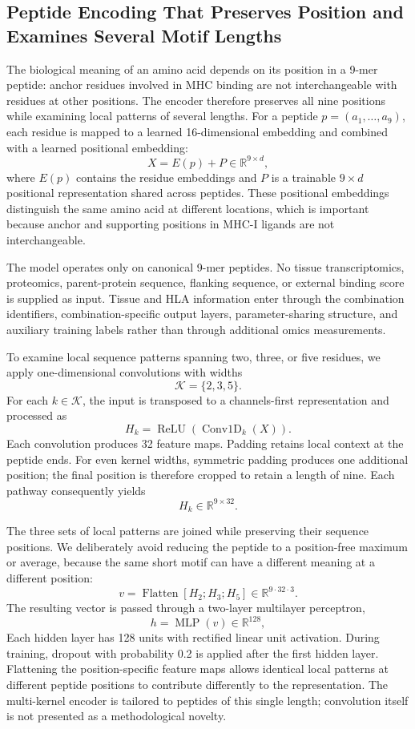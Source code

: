 \subsection{Peptide Encoding That Preserves Position and Examines Several Motif Lengths}

The biological meaning of an amino acid depends on its position in a 9-mer peptide: anchor residues involved in MHC binding are not interchangeable with residues at other positions. The encoder therefore preserves all nine positions while examining local patterns of several lengths. For a peptide \(p=(a_1,\ldots,a_9)\), each residue is mapped to a learned 16-dimensional embedding and combined with a learned positional embedding:
\[
X=E(p)+P \in \mathbb{R}^{9\times d},
\]
where \(E(p)\) contains the residue embeddings and \(P\) is a trainable \(9\times d\) positional representation shared across peptides. These positional embeddings distinguish the same amino acid at different locations, which is important because anchor and supporting positions in MHC-I ligands are not interchangeable.

The model operates only on canonical 9-mer peptides. No tissue transcriptomics, proteomics, parent-protein sequence, flanking sequence, or external binding score is supplied as input. Tissue and HLA information enter through the combination identifiers, combination-specific output layers, parameter-sharing structure, and auxiliary training labels rather than through additional omics measurements.

To examine local sequence patterns spanning two, three, or five residues, we apply one-dimensional convolutions with widths
\[
\mathcal{K}=\{2,3,5\}.
\]
For each \(k\in\mathcal{K}\), the input is transposed to a channels-first representation and processed as
\[
H_k
=
\operatorname{ReLU}
\left(
\operatorname{Conv1D}_{k}(X)
\right).
\]
Each convolution produces 32 feature maps. Padding retains local context at the peptide ends. For even kernel widths, symmetric padding produces one additional position; the final position is therefore cropped to retain a length of nine. Each pathway consequently yields
\[
H_k\in\mathbb{R}^{9\times 32}.
\]

The three sets of local patterns are joined while preserving their sequence positions. We deliberately avoid reducing the peptide to a position-free maximum or average, because the same short motif can have a different meaning at a different position:
\[
v
=
\operatorname{Flatten}
\left[
H_2;H_3;H_5
\right]
\in\mathbb{R}^{9\cdot32\cdot3}.
\]
The resulting vector is passed through a two-layer multilayer perceptron,
\[
h
=
\operatorname{MLP}(v)
\in\mathbb{R}^{128},
\]
Each hidden layer has 128 units with rectified linear unit activation. During training, dropout with probability 0.2 is applied after the first hidden layer. Flattening the position-specific feature maps allows identical local patterns at different peptide positions to contribute differently to the representation. The multi-kernel encoder is tailored to peptides of this single length; convolution itself is not presented as a methodological novelty.

